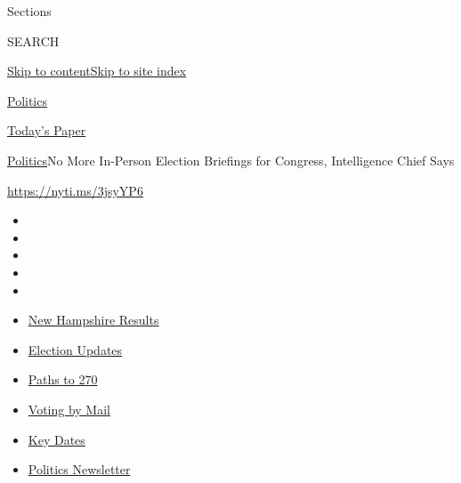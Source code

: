 Sections

SEARCH

\protect\hyperlink{site-content}{Skip to
content}\protect\hyperlink{site-index}{Skip to site index}

\href{https://www.nytimes3xbfgragh.onion/section/politics}{Politics}

\href{https://myaccount.nytimes3xbfgragh.onion/auth/login?response_type=cookie\&client_id=vi}{}

\href{https://www.nytimes3xbfgragh.onion/section/todayspaper}{Today's
Paper}

\href{/section/politics}{Politics}\textbar{}No More In-Person Election
Briefings for Congress, Intelligence Chief Says

\url{https://nyti.ms/3jsyYP6}

\begin{itemize}
\item
\item
\item
\item
\item
\end{itemize}

\begin{itemize}
\item
  \href{https://www.nytimes3xbfgragh.onion/interactive/2020/09/08/us/elections/results-new-hampshire-primary-elections.html?action=click\&pgtype=Article\&state=default\&region=TOP_BANNER\&context=storylines_menu}{New
  Hampshire Results}
\item
  \href{https://www.nytimes3xbfgragh.onion/live/2020/09/08/us/trump-vs-biden?action=click\&pgtype=Article\&state=default\&region=TOP_BANNER\&context=storylines_menu}{Election
  Updates}
\item
  \href{https://www.nytimes3xbfgragh.onion/interactive/2020/us/elections/election-states-biden-trump.html?action=click\&pgtype=Article\&state=default\&region=TOP_BANNER\&context=storylines_menu}{Paths
  to 270}
\item
  \href{https://www.nytimes3xbfgragh.onion/interactive/2020/08/31/us/politics/vote-by-mail-deadlines.html?action=click\&pgtype=Article\&state=default\&region=TOP_BANNER\&context=storylines_menu}{Voting
  by Mail}
\item
  \href{https://www.nytimes3xbfgragh.onion/interactive/2019/us/elections/2020-presidential-election-calendar.html?action=click\&pgtype=Article\&state=default\&region=TOP_BANNER\&context=storylines_menu}{Key
  Dates}
\item
  \href{https://www.nytimes3xbfgragh.onion/newsletters/politics?action=click\&pgtype=Article\&state=default\&region=TOP_BANNER\&context=storylines_menu}{Politics
  Newsletter}
\end{itemize}

